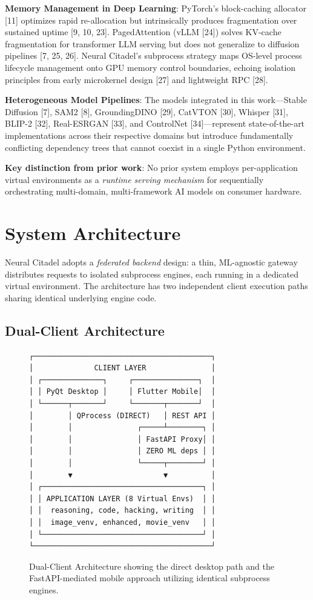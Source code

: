 \documentclass[conference]{IEEEtran}
\begin{document}
\textbf{Memory Management in Deep Learning}: PyTorch's block-caching allocator [11] optimizes rapid re-allocation but intrinsically produces fragmentation over sustained uptime [9, 10, 23]. PagedAttention (vLLM [24]) solves KV-cache fragmentation for transformer LLM serving but does not generalize to diffusion pipelines [7, 25, 26]. Neural Citadel's subprocess strategy maps OS-level process lifecycle management onto GPU memory control boundaries, echoing isolation principles from early microkernel design [27] and lightweight RPC [28].

\textbf{Heterogeneous Model Pipelines}: The models integrated in this work---Stable Diffusion [7], SAM2 [8], GroundingDINO [29], CatVTON [30], Whisper [31], BLIP-2 [32], Real-ESRGAN [33], and ControlNet [34]---represent state-of-the-art implementations across their respective domains but introduce fundamentally conflicting dependency trees that cannot coexist in a single Python environment.

\textbf{Key distinction from prior work}: No prior system employs per-application virtual environments as a \textit{runtime serving mechanism} for sequentially orchestrating multi-domain, multi-framework AI models on consumer hardware.

\section{System Architecture}
Neural Citadel adopts a \textit{federated backend} design: a thin, ML-agnostic gateway distributes requests to isolated subprocess engines, each running in a dedicated virtual environment. The architecture has two independent client execution paths sharing identical underlying engine code.

\subsection{Dual-Client Architecture}

\begin{figure}[h]
\centering
\begin{verbatim}
┌─────────────────────────────────────────┐
│              CLIENT LAYER               │
│ ┌──────────────┐     ┌───────────────┐  │
│ │ PyQt Desktop │     │ Flutter Mobile│  │
│ └──────┬───────┘     └───────┬───────┘  │
│        │ QProcess (DIRECT)   │ REST API │
│        │               ┌─────┴────────┐ │
│        │               │ FastAPI Proxy│ │
│        │               │ ZERO ML deps │ │
│        │               └─────┬────────┘ │
│        ▼                     ▼          │
│ ┌─────────────────────────────────────┐ │
│ │ APPLICATION LAYER (8 Virtual Envs)  │ │
│ │  reasoning, code, hacking, writing  │ │
│ │  image_venv, enhanced, movie_venv   │ │
│ └─────────────────────────────────────┘ │
└─────────────────────────────────────────┘
\end{verbatim}
\caption{Dual-Client Architecture showing the direct desktop path and the FastAPI-mediated mobile approach utilizing identical subprocess engines.}
\label{fig:arch}
\end{figure}
\end{document}
